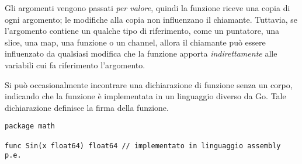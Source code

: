 \documentclass[../../thesis.tex]{subfiles}
\begin{document}
    Gli argomenti vengono passati \textit{per valore}, quindi la funzione riceve una copia di ogni argomento;
    le modifiche alla copia non influenzano il chiamante.
    Tuttavia, se l'argomento contiene un qualche tipo di riferimento, come un puntatore, una slice, una map, una funzione o un channel, allora il chiamante può essere influenzato da qualsiasi modifica che la funzione apporta \textit{indirettamente} alle variabili cui fa riferimento l'argomento.
    \hfill \vspace{12pt}

    Si può occasionalmente incontrare una dichiarazione di funzione senza un corpo, indicando che la funzione è implementata in un linguaggio diverso da Go. Tale dichiarazione definisce la firma della funzione.
    \begin{lstlisting}[frame = single, label = {lst:lstlisting4-1.4}]
package math

func Sin(x float64) float64 // implementato in linguaggio assembly p.e.
    \end{lstlisting}
\end{document}
